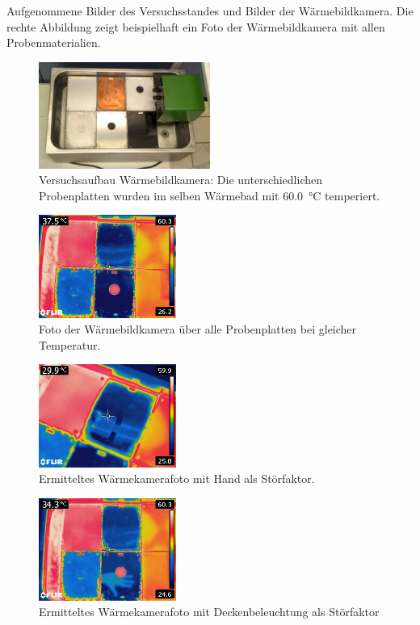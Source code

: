 Aufgenommene Bilder des Versuchsstandes und Bilder der Wärmebildkamera. 
Die rechte Abbildung zeigt beispielhaft ein Foto der Wärmebildkamera mit allen Probenmaterialien. 

\begin{figure}[H]
		\centering
		\includegraphics[width=0.5\textwidth]{../FLIR_100/FLIR2240.jpg}
		\caption{Versuchsaufbau Wärmebildkamera: Die unterschiedlichen Probenplatten wurden im selben Wärmebad mit \SI{60,0}{\celsius} temperiert.}
		\label{fig:VersuchsaufbauWBK}
\end{figure}

\begin{figure}[H]
		\centering
		\includegraphics[width=0.4\textwidth]{../FLIR_100/FLIR2241.jpg}
		\caption{Foto der Wärmebildkamera über alle Probenplatten bei gleicher Temperatur.}
		\label{fig:FotoWBK}
\end{figure}

\begin{figure}[H]
		\centering
		\includegraphics[width=0.4\textwidth]{../FLIR_100/FLIR2249.jpg}
		\caption[Ermitteltes Wärmekamerafoto mit Hand als Störfaktor]{Ermitteltes Wärmekamerafoto mit Hand als Störfaktor.}
		\label{fig:WBKHand}
\end{figure}

\begin{figure}[H]
		\centering
		\includegraphics[width=0.4\textwidth]{../FLIR_100/FLIR2243.jpg}
		\caption[Ermitteltes Wärmekamerafoto mit Deckenbeleuchtung als Störfaktor]{Ermitteltes Wärmekamerafoto mit Deckenbeleuchtung als Störfaktor}
		\label{fig:WBKDecke}
\end{figure}

